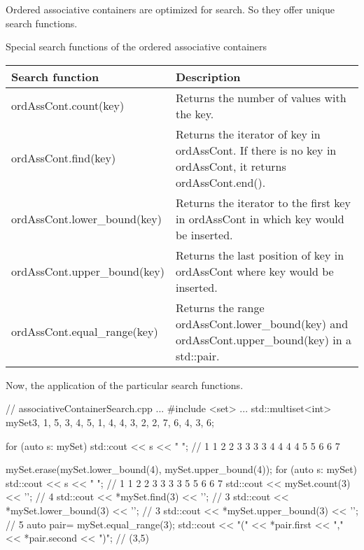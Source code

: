 
Ordered associative containers are optimized for search. So they offer unique search functions.

\begin{center}
Special search functions of the ordered associative containers
\end{center}

\begin{longtable}[c]{|l|l|}
\hline
\textbf{Search function} & \textbf{Description}                       \\ \hline
\endfirsthead
%
\endhead
%
ordAssCont.count(key)    & Returns the number of values with the key. \\ \hline
ordAssCont.find(key)         & Returns the iterator of key in ordAssCont. If there is no key in ordAssCont, it returns ordAssCont.end(). \\ \hline
ordAssCont.lower\_bound(key) & Returns the iterator to the first key in ordAssCont in which key would be inserted.                       \\ \hline
ordAssCont.upper\_bound(key) & Returns the last position of key in ordAssCont where key would be inserted.                               \\ \hline
ordAssCont.equal\_range(key) & Returns the range ordAssCont.lower\_bound(key) and ordAssCont.upper\_bound(key) in a std::pair.           \\ \hline
\end{longtable}

Now, the application of the particular search functions.


\begin{cpp}
// associativeContainerSearch.cpp
...
#include <set>
...
std::multiset<int> mySet{3, 1, 5, 3, 4, 5, 1, 4, 4, 3, 2, 2, 7, 6, 4, 3, 6};

for (auto s: mySet) std::cout << s << " ";
	// 1 1 2 2 3 3 3 3 4 4 4 4 5 5 6 6 7
	
mySet.erase(mySet.lower_bound(4), mySet.upper_bound(4));
for (auto s: mySet) std::cout << s << " ";
	// 1 1 2 2 3 3 3 3 5 5 6 6 7
std::cout << mySet.count(3) << '\n'; // 4
std::cout << *mySet.find(3) << '\n'; // 3
std::cout << *mySet.lower_bound(3) << '\n'; // 3
std::cout << *mySet.upper_bound(3) << '\n'; // 5
auto pair= mySet.equal_range(3);
std::cout << "(" << *pair.first << "," << *pair.second << ")"; // (3,5)
\end{cpp}


